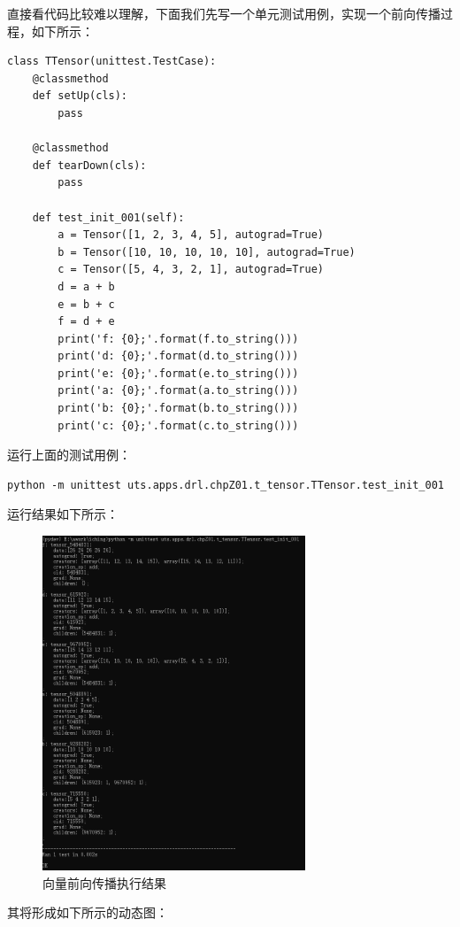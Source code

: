 直接看代码比较难以理解，下面我们先写一个单元测试用例，实现一个前向传播过程，如下所示：
\begin{lstlisting}
class TTensor(unittest.TestCase):
    @classmethod
    def setUp(cls):
        pass

    @classmethod
    def tearDown(cls):
        pass

    def test_init_001(self):
        a = Tensor([1, 2, 3, 4, 5], autograd=True)
        b = Tensor([10, 10, 10, 10, 10], autograd=True)
        c = Tensor([5, 4, 3, 2, 1], autograd=True)
        d = a + b
        e = b + c
        f = d + e
        print('f: {0};'.format(f.to_string()))
        print('d: {0};'.format(d.to_string()))
        print('e: {0};'.format(e.to_string()))
        print('a: {0};'.format(a.to_string()))
        print('b: {0};'.format(b.to_string()))
        print('c: {0};'.format(c.to_string()))
\end{lstlisting}
运行上面的测试用例：
\begin{lstlisting}
python -m unittest uts.apps.drl.chpZ01.t_tensor.TTensor.test_init_001
\end{lstlisting}
运行结果如下所示：
\begin{figure}[h]
	\caption{向量前向传播执行结果}
	\label{p000015}
	\centering
	\includegraphics[height=10cm]{images/p000015}
\end{figure}
其将形成如下所示的动态图：
